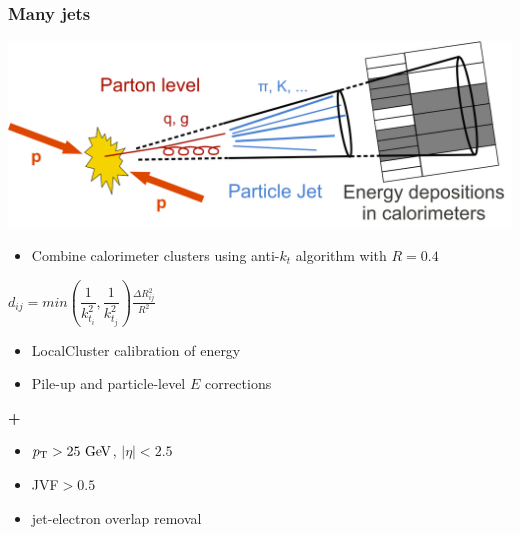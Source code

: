 \begin{frame}\frametitle{Many jets}
\centering\footnotesize

\begin{minipage}{.5\textwidth}\centering

\includegraphics[width=.78\textwidth]{pics/Sketch_PartonParticleCaloJet.png}\\

\begin{itemize}
\item Combine calorimeter clusters using anti-$k_t$ algorithm with $R=0.4$
\end{itemize}
$d_{ij}=min(\dfrac{1}{k_{t_i}^{2}},\dfrac{1}{k_{t_j}^{2}})\frac{\Delta R_{ij}^{2}}{R^{2}}$
\begin{itemize}
\item LocalCluster calibration of energy
\item Pile-up and particle-level $E$ corrections
\end{itemize}
{\cccolor \bfseries +}\\
\begin{itemize}
\item $\pt>25\gev$, $|\eta|<2.5$
\item JVF$>0.5$
\item jet-electron overlap removal
\end{itemize}


\end{minipage}\begin{minipage}{.5\textwidth}\centering


\end{minipage}
\end{frame}
